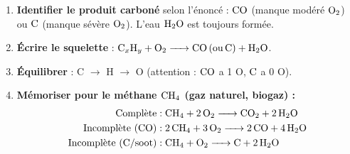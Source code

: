\documentclass[11pt]{article}
\begin{document}
\begin{methode}
\begin{enumerate}
    \item \textbf{Identifier le produit carboné} selon l'énoncé : $\ce{CO}$ (manque modéré $\ce{O2}$) ou $\ce{C}$ (manque sévère $\ce{O2}$). L'eau $\ce{H2O}$ est toujours formée.
    \item \textbf{Écrire le squelette} : $\ce{C_xH_y + O2 -> CO (ou C) + H2O}$.
    \item \textbf{Équilibrer} : C $\to$ H $\to$ O (attention : $\ce{CO}$ a 1 O, $\ce{C}$ a 0 O).
    \item \textbf{Mémoriser pour le méthane $\ce{CH4}$ (gaz naturel, biogaz) :}
    \begin{align*}
        \text{Complète} &: \ce{CH4 + 2 O2 -> CO2 + 2 H2O} \\
        \text{Incomplète (CO)} &: \ce{2 CH4 + 3 O2 -> 2 CO + 4 H2O} \\
        \text{Incomplète (C/soot)} &: \ce{CH4 + O2 -> C + 2 H2O}
    \end{align*}
\end{enumerate}
\end{methode}
\end{document}
